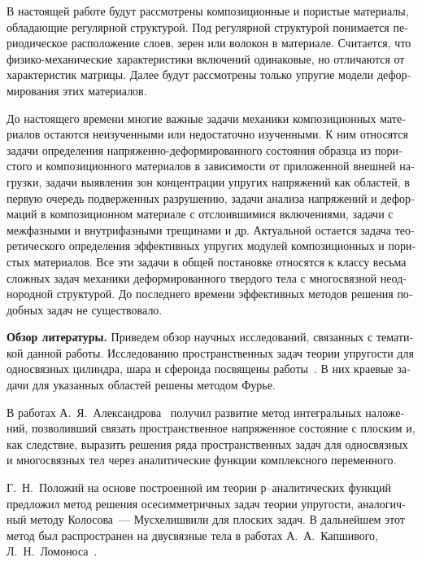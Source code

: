 \begin{russian}
В настоящей работе будут рассмотрены композиционные и пористые материалы, обладающие регулярной структурой. Под регулярной структурой понимается периодическое расположение слоев, зерен или волокон в материале. Считается, что фи\-зи\-ко-\-ме\-ха\-ни\-че\-ские характеристики включений одинаковые, но отличаются от характеристик матрицы. Далее будут рассмотрены только упругие модели деформирования этих материалов.

До настоящего времени многие важные задачи механики композиционных материалов остаются неизученными или недостаточно изученными. К ним относятся задачи определения напряженно-деформированного состояния образца из пористого и композиционного материалов в зависимости от приложенной внешней нагрузки, задачи выявления зон концентрации упругих напряжений как областей, в первую очередь подверженных разрушению, задачи анализа напряжений и деформаций в композиционном материале с отслоившимися включениями, задачи с межфазными и внутрифазными трещинами и др. Актуальной остается задача теоретического определения эффективных упругих модулей композиционных и пористых материалов. Все эти задачи в общей постановке относятся к классу весьма сложных задач механики деформированного твердого тела с многосвязной неоднородной структурой. До последнего времени эффективных методов решения подобных задач не существовало. 

{\bf Обзор литературы.} Приведем обзор научных исследований, связанных с тематикой данной работы. Исследованию пространственных задач теории упругости для односвязных цилиндра, шара и сфероида посвящены работы~\cite{Abramian, Andreev, Valov, Volpert1977, Volpert1967, Gomilko, Grinchenko1965, Grinchenko1967, Grinchenko1985, Grinchenko1978, Lur'e, Podilchuk1967, Podilchuk1984, Prokopov, Tokovyy, Ulitko, Chen1978-1, Chen1978-2, Edwards, Zhong, Zureick1989, Zureick1988, Ambartsumian, Arutynian, Kaufman, Kolesov, Meleshko}. В них краевые задачи для указанных областей решены методом Фурье.

В работах А.~Я.~Александрова~\cite{Aleksandrov1978, Aleksandrov1973} получил развитие метод интегральных наложений, позволивший связать пространственное напряженное состояние с плоским и, как следствие, выразить решения ряда пространственных задач для односвязных и многосвязных тел через аналитические функции комплексного переменного.

Г.~Н.~Положий на основе построенной им теории р–аналитических функций предложил метод решения осесимметричных задач теории упругости, аналогичный методу Колосова~--- Мусхелишвили для плоских задач. В дальнейшем этот метод был распространен на двусвязные тела в работах А.~А.~Капшивого, Л.~Н.~Ломоноса~\cite{Kapshiviy, Lomonos}.


\end{russian}
